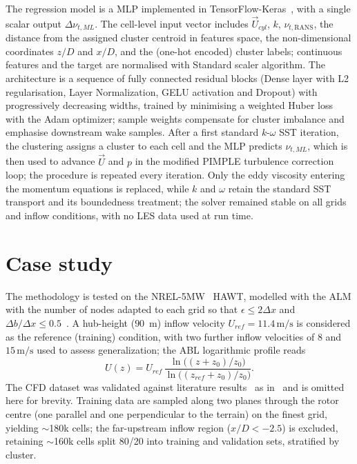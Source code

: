 \documentclass[12pt,a4paper]{article}
\begin{document}
The regression model is a MLP implemented in
TensorFlow-Keras~\cite{tensorflow2015-whitepaper}, with a single scalar output
$\Delta\nu_{t,ML}$. The cell-level input vector includes $\vec{U}_{cyl}$, $k$,
$\nu_{t,\mathrm{RANS}}$, the distance from the assigned cluster centroid in features
space, the non-dimensional coordinates $z/D$ and $x/D$, and the (one-hot encoded) cluster
labels; continuous features and the target are normalised with Standard scaler algorithm.
The architecture is a sequence of fully connected residual blocks (Dense layer with L2
regularisation, Layer Normalization, GELU activation and Dropout) with progressively
decreasing widths, trained by minimising a weighted Huber loss with the Adam optimizer;
sample weights compensate for cluster imbalance and emphasise downstream wake samples.
After a first standard $k$-$\omega$ SST iteration, the clustering assigns a cluster to
each cell and the MLP predicts $\nu_{t,ML}$, which is then used to advance $\vec{U}$ and
$p$ in the modified PIMPLE turbulence correction loop; the procedure is repeated every
iteration. Only the eddy viscosity entering the momentum equations is replaced, while $k$
and $\omega$ retain the standard SST transport and its boundedness treatment; the solver
remained stable on all grids and inflow conditions, with no LES data used at run time.

\section{Case study}
\label{sec:case_study}
The methodology is tested on the NREL-5MW~\cite{NREL_5MW} HAWT, modelled with the ALM with
the number of nodes adapted to each grid so that $\epsilon \le 2\Delta x$ and $\Delta
b/\Delta x \le 0.5$~\cite{inproceedings}. A hub-height ($90$~m) inflow velocity $U_{ref} =
11.4\,\mathrm{m/s}$ is considered as the reference (training) condition, with two further
inflow velocities of $8$ and $15\,\mathrm{m/s}$ used to assess generalization; the ABL
logarithmic profile reads
\begin{equation}
    U(z) = U_{ref}\,\frac{\ln\!\big((z+z_0)/z_0\big)}{\ln\!\big((z_{ref}+z_0)/z_0\big)} .
    \label{eq:ABL_log_equation}
\end{equation}
The CFD dataset was validated against literature results~\cite{alessio5-mw,Troldborg} as
in~\cite{Carloni2026} and is omitted here for brevity. Training data are sampled along two
planes through the rotor centre (one parallel and one perpendicular to the terrain) on the
finest grid, yielding $\sim$180k cells; the far-upstream inflow region ($x/D<-2.5$) is
excluded, retaining $\sim$160k cells split 80/20 into training and validation sets,
stratified by cluster.
\end{document}
